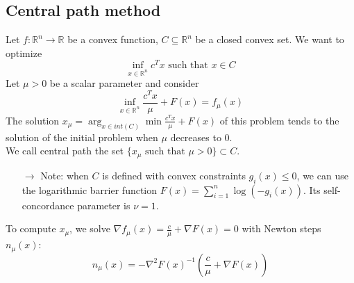 \documentclass[12pt, openany]{report}
\newcommand{\R}{\mathbb{R}}
\theoremstyle{definition}
\begin{document}
\subsection{Central path method}
Let $f:\R^n\rightarrow \R$ be a convex function, $C\subseteq \R^n$ be a closed convex set. We want to optimize 
\begin{equation}
    \inf_{x\in \R^n}c^Tx \text{   such that   } x\in C
\end{equation}
Let $\mu>0$ be a scalar parameter and consider 
\begin{equation}
    \inf_{x\in \R^n} \frac{c^Tx}{\mu}+F(x) = f_{\mu}(x)
\end{equation}
The solution $x_\mu = \arg_{x\in int(C)} \min \frac{c^Tx}{\mu}+F(x)$ of this problem tends to the solution of the initial problem when $\mu$ decreases to 0. \\

We call central path the set $\{ x_\mu \text{ such that }\mu>0\}\subset C$.
\begin{itemize}
    \item [\(\rightarrow\)] Note: when $C$ is defined with convex constraints $g_i(x)\le 0$, we can use the logarithmic barrier function $F(x) = \sum_{i=1}^n\log(-g_i(x))$. Its self-concordance parameter is $\nu=1$.
\end{itemize}
To compute $x_\mu$, we solve $\nabla f_\mu(x)=\frac{c}{\mu}+\nabla F(x) = 0$ with Newton steps $n_\mu(x)$:
\begin{equation}
    n_\mu(x) = -\nabla^2F(x)^{-1}\left(\frac{c}{\mu}+\nabla F(x)\right)
\end{equation}
\end{document}
